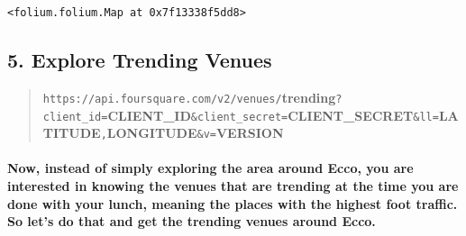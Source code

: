 \documentclass[11pt]{article}
\makeatletter
\newcommand{\boxspacing}{\kern\kvtcb@left@rule\kern\kvtcb@boxsep}
\newcommand{\prompt}[4]{
        \ttfamily\llap{{\color{#2}[#3]:\hspace{3pt}#4}}\vspace{-\baselineskip}
    }
\makeatother
\begin{document}
            \begin{tcolorbox}[breakable, size=fbox, boxrule=.5pt, pad at break*=1mm, opacityfill=0]
\prompt{Out}{outcolor}{48}{\boxspacing}
\begin{Verbatim}[commandchars=\\\{\}]
<folium.folium.Map at 0x7f13338f5dd8>
\end{Verbatim}
\end{tcolorbox}
        
    

    

    \hypertarget{explore-trending-venues}{%
\subsection{5. Explore Trending Venues}\label{explore-trending-venues}}

\begin{quote}
\texttt{https://api.foursquare.com/v2/venues/}\textbf{trending}\texttt{?client\_id=}\textbf{CLIENT\_ID}\texttt{\&client\_secret=}\textbf{CLIENT\_SECRET}\texttt{\&ll=}\textbf{LATITUDE}\texttt{,}\textbf{LONGITUDE}\texttt{\&v=}\textbf{VERSION}
\end{quote}

    \hypertarget{now-instead-of-simply-exploring-the-area-around-ecco-you-are-interested-in-knowing-the-venues-that-are-trending-at-the-time-you-are-done-with-your-lunch-meaning-the-places-with-the-highest-foot-traffic.-so-lets-do-that-and-get-the-trending-venues-around-ecco.}{%
\paragraph{Now, instead of simply exploring the area around Ecco, you
are interested in knowing the venues that are trending at the time you
are done with your lunch, meaning the places with the highest foot
traffic. So let's do that and get the trending venues around
Ecco.}\label{now-instead-of-simply-exploring-the-area-around-ecco-you-are-interested-in-knowing-the-venues-that-are-trending-at-the-time-you-are-done-with-your-lunch-meaning-the-places-with-the-highest-foot-traffic.-so-lets-do-that-and-get-the-trending-venues-around-ecco.}}
\end{document}

